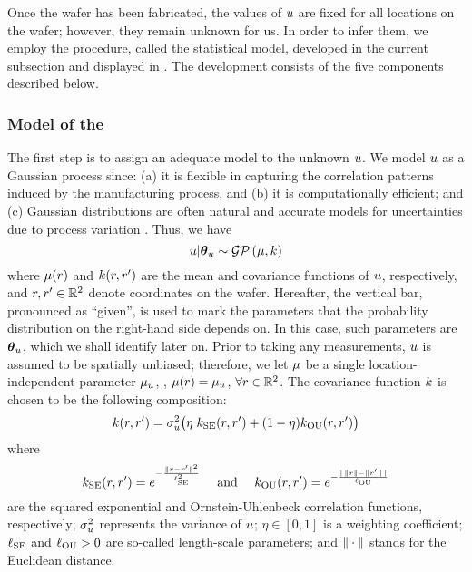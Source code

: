 Once the wafer has been fabricated, the values of $u$ are fixed for all locations on the wafer; however, they remain unknown for us.
In order to infer them, we employ the procedure, called the statistical model, developed in the current subsection and displayed in .
The development consists of the five components described below.

\subsubsection{Model of the \qoi}
The first step is to assign an adequate model to the unknown $u$.
We model $u$ as a Gaussian process \cite{rasmussen2006} since: (a) it is flexible in capturing the correlation patterns induced by the manufacturing process, and (b) it is computationally efficient; and (c) Gaussian distributions are often natural and accurate models for uncertainties due to process variation \cite{srivastava2010, reda2009, juan2012}. Thus, we have
\begin{equation} \elabel{u-prior}
  \u | \vparam_\u \sim \gaussianp{\fMean}{\fCov}
\end{equation}
where $\fMean(\r)$ and $\fCov(\r, \r')$ are the mean and covariance functions of $u$, respectively, and $r, r' \in \mathbb{R}^2$ denote coordinates on the wafer.
Hereafter, the vertical bar, pronounced as ``given'', is used to mark the parameters that the probability distribution on the right-hand side depends on. In this case, such parameters are ${\boldsymbol\theta}_u$, which we shall identify later on.
Prior to taking any measurements, $u$ is assumed to be spatially unbiased; therefore, we let $\fMean$ be a single location-independent parameter $\mu_u$, \ie, $\fMean{r} = \mu_\u$, $\forall r \in \mathbb{R}^2$.
The covariance function $\fCov$ is chosen to be the following composition:
\begin{equation} \elabel{covariance-function}
  \fCov{\r, \r'} = \sigma_\u^2 \big( \eta \; \fCov_\SE(\r, \r') + (1 - \eta) \fCov_\OU(\r, \r') \big)
\end{equation}
where
\[
  \fCov_\SE(\r, \r') = e^{-\frac{\norm{\r - \r'}^2}{\ell_\SE^2}} \hspace{1em} \text{ and } \hspace{1em}
  \fCov_\OU(\r, \r') = e^{- \frac{\abs{\,\norm{\r} - \norm{\r'}\,}}{\ell_\OU}}
\]
are the squared exponential and Ornstein-Uhlenbeck correlation functions, respectively; $\sigma_u^2$ represents the variance of $u$; $\eta \in [0, 1]$ is a weighting coefficient; $\ell_{\text{SE}}$ and $\ell_{\text{OU}} > 0$ are so-called length-scale parameters; and $\| \cdot \|$ stands for the Euclidean distance.
